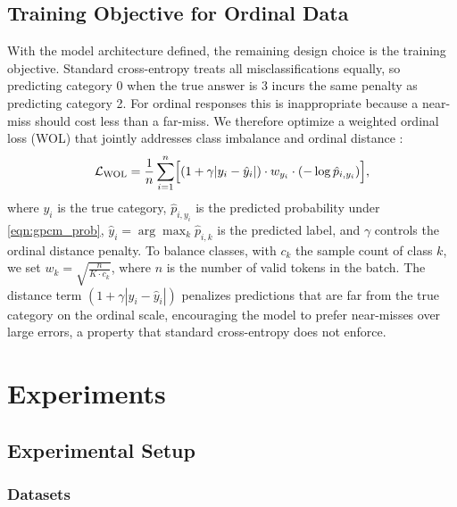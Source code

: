 \documentclass[pdflatex,sn-apa]{sn-jnl}
\begin{document}
\subsection{Training Objective for Ordinal Data}
With the model architecture defined, the remaining design choice is the training objective. Standard cross-entropy treats all misclassifications equally, so predicting category 0 when the true answer is 3 incurs the same penalty as predicting category 2. For ordinal responses this is inappropriate because a near-miss should cost less than a far-miss. We therefore optimize a weighted ordinal loss (WOL) that jointly addresses class imbalance and ordinal distance \citep{gutierrez_ordinal_2016, de_la_torre_weighted_2018}:
\begin{equation}\label{eqn:wol_loss}
    \mathcal{L}_{\mathrm{WOL}}
    =\frac{1}{n}\sum_{i=1}^{n}\Bigl[(1+\gamma|y_i-\hat{y}_i|)\cdot w_{y_i}\cdot(-\log \hat{p}_{i,y_i})\Bigr],
\end{equation}
where $y_i$ is the true category, $\hat{p}_{i,y_i}$ is the predicted probability under \eqref{eqn:gpcm_prob},
$\hat{y}_i=\arg\max_k \hat{p}_{i,k}$ is the predicted label, and $\gamma$ controls the ordinal distance penalty.
To balance classes, with $c_k$ the sample count of class $k$, we set $w_k=\sqrt{\frac{n}{K\cdot c_k}}$, where $n$ is the number of valid tokens in the batch. The distance term $(1+\gamma|y_i-\hat{y}_i|)$ penalizes predictions that are far from the true category on the ordinal scale, encouraging the model to prefer near-misses over large errors, a property that standard cross-entropy does not enforce.

\section{Experiments}


\subsection{Experimental Setup}
\subsubsection{Datasets}
\end{document}

